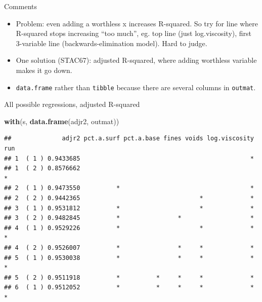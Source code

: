 \documentclass[
  ignorenonframetext,
]{beamer}
\newenvironment{Shaded}{\begin{snugshade}}{\end{snugshade}}
\newcommand{\KeywordTok}[1]{\textcolor[rgb]{0.13,0.29,0.53}{\textbf{#1}}}
\newcommand{\NormalTok}[1]{#1}
\providecommand{\tightlist}{%
  \setlength{\itemsep}{0pt}\setlength{\parskip}{0pt}}
\begin{document}
\begin{frame}[fragile]{Comments}
\protect\hypertarget{comments-22}{}

\begin{itemize}
\tightlist
\item
  Problem: even adding a worthless x increases R-squared. So try for
  line where R-squared stops increasing ``too much'', eg. top line (just
  log.viscosity), first 3-variable line (backwards-elimination model).
  Hard to judge.
\item
  One solution (STAC67): adjusted R-squared, where adding worthless
  variable makes it go down.
\item
  \texttt{data.frame} rather than \texttt{tibble} because there are
  several columns in \texttt{outmat}.
\end{itemize}

\end{frame}

\begin{frame}[fragile]{All possible regressions, adjusted R-squared}
\protect\hypertarget{all-possible-regressions-adjusted-r-squared}{}

\scriptsize

\begin{Shaded}
\begin{Highlighting}[]
\KeywordTok{with}\NormalTok{(s, }\KeywordTok{data.frame}\NormalTok{(adjr2, outmat))}
\end{Highlighting}
\end{Shaded}

\begin{verbatim}
##              adjr2 pct.a.surf pct.a.base fines voids log.viscosity run
## 1  ( 1 ) 0.9433685                                               *    
## 1  ( 2 ) 0.8576662                                                   *
## 2  ( 1 ) 0.9473550          *                                    *    
## 2  ( 2 ) 0.9442365                                 *             *    
## 3  ( 1 ) 0.9531812          *                      *             *    
## 3  ( 2 ) 0.9482845          *                *                   *    
## 4  ( 1 ) 0.9529226          *                      *             *   *
## 4  ( 2 ) 0.9526007          *                *     *             *    
## 5  ( 1 ) 0.9530038          *                *     *             *   *
## 5  ( 2 ) 0.9511918          *          *     *     *             *    
## 6  ( 1 ) 0.9512052          *          *     *     *             *   *
\end{verbatim}

\normalsize

\end{frame}
\end{document}
